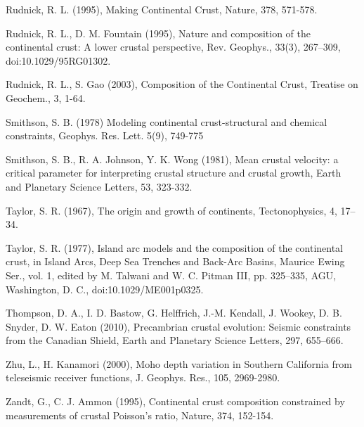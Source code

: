 \documentclass[draft, 12pt]{article}
\begin{document}
Rudnick, R. L. (1995), Making Continental Crust, Nature, 378, 571-578.

Rudnick, R. L., D. M. Fountain (1995), Nature and composition of the continental crust: A lower crustal perspective, Rev. Geophys., 33(3), 267–309, doi:10.1029/95RG01302.

Rudnick, R. L., S. Gao (2003), Composition of the Continental Crust, Treatise on Geochem., 3, 1-64.

Smithson, S. B. (1978) Modeling continental crust-structural and chemical constraints, Geophys. Res. Lett. 5(9), 749-775

Smithson, S. B., R. A. Johnson, Y. K. Wong (1981), Mean crustal velocity: a critical parameter for interpreting crustal structure and crustal growth, Earth and Planetary Science Letters, 53, 323-332.

Taylor, S. R. (1967), The origin and growth of continents, Tectonophysics, 4, 17–34.

Taylor, S. R. (1977), Island arc models and the composition of the continental crust, in Island Arcs, Deep Sea Trenches and Back-Arc Basins, Maurice Ewing Ser., vol. 1, edited by M. Talwani and W. C. Pitman III, pp. 325–335, AGU, Washington, D. C., doi:10.1029/ME001p0325.

Thompson, D. A., I. D. Bastow, G. Helffrich, J.-M. Kendall, J. Wookey, D. B. Snyder, D. W. Eaton (2010), Precambrian crustal evolution: Seismic constraints from the Canadian Shield, Earth and Planetary Science Letters, 297, 655–666.

Zhu, L., H. Kanamori (2000), Moho depth variation in Southern California from teleseismic receiver functions, J. Geophys. Res., 105, 2969-2980.

Zandt, G., C. J. Ammon (1995), Continental crust composition constrained by measurements of crustal Poisson's ratio, Nature, 374, 152-154.
\end{document}
